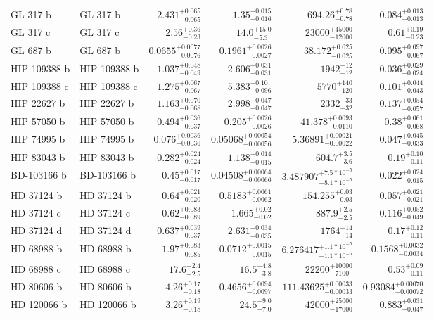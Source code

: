 \begin{longtable*}{llrrrr}
GL 317 b & GL 317 b & $2.431^{+0.065}_{-0.065}$ & $1.35^{+0.015}_{-0.016}$ & $694.26^{+0.78}_{-0.78}$ & $0.084^{+0.013}_{-0.013}$ \\ 
GL 317 c & GL 317 c & $2.56^{+0.36}_{-0.23}$ & $14.0^{+15.0}_{-5.3}$ & $23000^{+45000}_{-12000}$ & $0.61^{+0.19}_{-0.23}$ \\ 
GL 687 b & GL 687 b & $0.0655^{+0.0077}_{-0.0076}$ & $0.1961^{+0.0026}_{-0.0027}$ & $38.172^{+0.025}_{-0.025}$ & $0.095^{+0.097}_{-0.067}$ \\ 
HIP 109388 b & HIP 109388 b & $1.037^{+0.048}_{-0.049}$ & $2.606^{+0.031}_{-0.031}$ & $1942^{+12}_{-12}$ & $0.036^{+0.029}_{-0.024}$ \\ 
HIP 109388 c & HIP 109388 c & $1.275^{+0.067}_{-0.067}$ & $5.383^{+0.10}_{-0.096}$ & $5770^{+140}_{-120}$ & $0.101^{+0.044}_{-0.043}$ \\ 
HIP 22627 b & HIP 22627 b & $1.163^{+0.070}_{-0.068}$ & $2.998^{+0.047}_{-0.047}$ & $2332^{+33}_{-32}$ & $0.137^{+0.054}_{-0.057}$ \\ 
HIP 57050 b & HIP 57050 b & $0.494^{+0.036}_{-0.037}$ & $0.205^{+0.0026}_{-0.0026}$ & $41.378^{+0.0093}_{-0.0110}$ & $0.38^{+0.061}_{-0.068}$ \\ 
HIP 74995 b & HIP 74995 b & $0.076^{+0.0036}_{-0.0036}$ & $0.05068^{+0.00054}_{-0.00056}$ & $5.36891^{+0.00021}_{-0.00022}$ & $0.047^{+0.045}_{-0.033}$ \\ 
HIP 83043 b & HIP 83043 b & $0.282^{+0.024}_{-0.024}$ & $1.138^{+0.014}_{-0.015}$ & $604.7^{+3.5}_{-3.6}$ & $0.19^{+0.10}_{-0.11}$ \\ 
BD-103166 b & BD-103166 b & $0.45^{+0.017}_{-0.017}$ & $0.04508^{+0.00064}_{-0.00066}$ & $3.487907^{+7.5*10^{-5}}_{-8.1*10^{-5}}$ & $0.022^{+0.024}_{-0.015}$ \\ 
HD 37124 b & HD 37124 b & $0.64^{+0.021}_{-0.020}$ & $0.5183^{+0.0061}_{-0.0062}$ & $154.255^{+0.03}_{-0.03}$ & $0.057^{+0.021}_{-0.021}$ \\ 
HD 37124 c & HD 37124 c & $0.62^{+0.083}_{-0.089}$ & $1.665^{+0.02}_{-0.02}$ & $887.9^{+2.5}_{-2.5}$ & $0.116^{+0.052}_{-0.049}$ \\ 
HD 37124 d & HD 37124 d & $0.637^{+0.039}_{-0.037}$ & $2.631^{+0.034}_{-0.035}$ & $1764^{+14}_{-14}$ & $0.17^{+0.12}_{-0.11}$ \\ 
HD 68988 b & HD 68988 b & $1.97^{+0.083}_{-0.085}$ & $0.0712^{+0.0015}_{-0.0015}$ & $6.276417^{+1.1*10^{-5}}_{-1.1*10^{-5}}$ & $0.1568^{+0.0032}_{-0.0034}$ \\ 
HD 68988 c & HD 68988 c & $17.6^{+2.4}_{-2.5}$ & $16.5^{+4.8}_{-3.8}$ & $22200^{+10000}_{-7100}$ & $0.53^{+0.09}_{-0.11}$ \\ 
HD 80606 b & HD 80606 b & $4.26^{+0.17}_{-0.18}$ & $0.4656^{+0.0094}_{-0.0097}$ & $111.43625^{+0.00033}_{-0.00033}$ & $0.93084^{+0.00070}_{-0.00072}$ \\ 
HD 120066 b & HD 120066 b & $3.26^{+0.19}_{-0.18}$ & $24.5^{+9.0}_{-7.0}$ & $42000^{+25000}_{-17000}$ & $0.883^{+0.031}_{-0.047}$ \\ 
\bottomrule 
\end{longtable*} 
